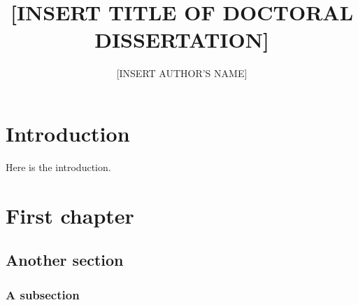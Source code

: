 \documentclass{ruthesis}
\begin{document}
\phd

\copyrightpage
\tablespage
\figurespage

\title{[INSERT TITLE OF DOCTORAL DISSERTATION]}
\author{[INSERT AUTHOR'S NAME]}


\beforepreface
{}
\dedication{The body of the dedication}
\afterpreface

\chapter{Introduction}
Here is the introduction.

\chapter{First chapter}
\section{Another section}
\subsection{A subsection}

\appendix



\end{document}
